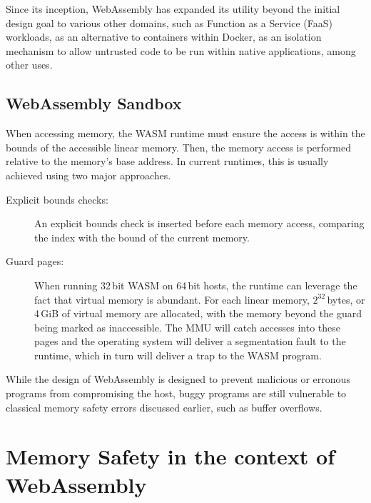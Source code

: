 Since its inception, WebAssembly has expanded its utility beyond the initial design goal to various other domains, such as Function as a Service (FaaS) workloads, as an alternative to containers within Docker, as an isolation mechanism to allow untrusted code to be run within native applications, among other uses.

\subsection{WebAssembly Sandbox}
\label{subsec:webassembly-sandbox}
When accessing memory, the \ac{WASM} runtime must ensure the access is within the bounds of the accessible linear memory.
Then, the memory access is performed relative to the memory's base address.
In current runtimes, this is usually achieved using two major approaches.
\begin{description}
    \item[Explicit bounds checks:] An explicit bounds check is inserted before each memory access, comparing the index with the bound of the current memory.
    \item[Guard pages:] When running 32\,bit \ac{WASM} on 64\,bit hosts, the runtime can leverage the fact that virtual memory is abundant.
    For each linear memory, $2^{32}$\,bytes, or 4\,GiB of virtual memory are allocated, with the memory beyond the guard being marked as inaccessible.
    The MMU will catch accesses into these pages and the operating system will deliver a segmentation fault to the runtime, which in turn will deliver a trap to the \ac{WASM} program.
\end{description}


While the design of WebAssembly is designed to prevent malicious or erronous programs from compromising the host, buggy programs are still vulnerable to classical memory safety errors discussed earlier, such as buffer overflows.

\section{Memory Safety in the context of WebAssembly}
\label{sec:memory-safety}

